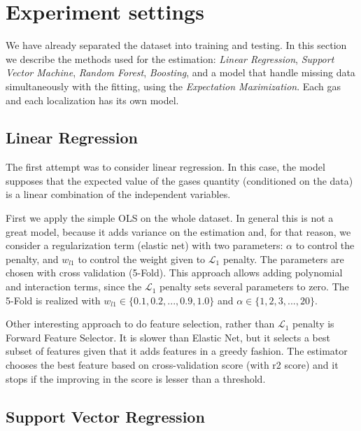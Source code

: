 \section{Experiment settings}
\label{sec:experiments}

We have already separated the dataset into training and testing. In this
section we describe the methods used for the estimation: {\em Linear
Regression}, {\em Support Vector Machine}, {\em Random Forest}, {\em
Boosting}, and a model that handle missing data simultaneously with the
fitting, using the {\em Expectation Maximization}. Each gas and each
localization has its own model. 

\subsection{Linear Regression}

The first attempt was to consider linear regression. In this case, the model
supposes that the expected value of the gases quantity (conditioned on the
data) is a linear combination of the independent variables. 

First we apply the simple OLS on the whole dataset. In general this is not a
great model, because it adds variance on the estimation and, for that reason, we consider a regularization term (elastic
net) with two parameters: $\alpha$ to control the penalty, and $w_{l1}$ to
control the weight given to $\mathcal{L}_1$ penalty. The parameters are chosen
with cross validation (5-Fold). This approach allows adding polynomial and
interaction terms, since the $\mathcal{L}_1$ penalty sets several parameters
to zero. The 5-Fold is realized with $w_{l1} \in \{0.1, 0.2, ..., 0.9, 1.0\}$
and $\alpha \in \{1,2,3,...,20\}$. 

Other interesting approach to do feature selection, rather than $\mathcal{L}_1$
penalty is Forward Feature Selector. It is slower than Elastic Net, but it
selects a best subset of features given that it adds     features in a greedy
fashion. The estimator chooses the best feature based on
cross-validation score (with r2 score) and it stops if the improving in the
score is lesser than a threshold. 

\subsection{Support Vector Regression}

